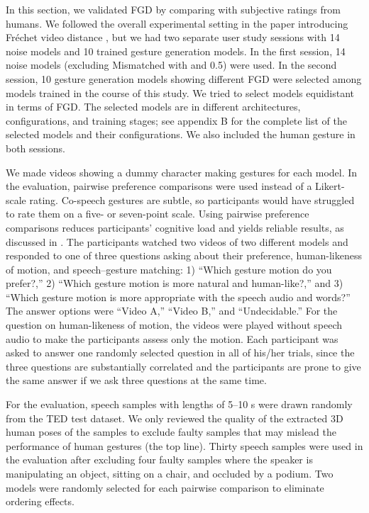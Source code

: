 \documentclass[acmtog]{acmart}
\begin{document}
In this section, we validated FGD by comparing with subjective ratings from humans. We followed the overall experimental setting in the paper introducing Fr\'{e}chet video distance \cite{unterthiner2018towards}, but we had two separate user study sessions with 14 noise models and 10 trained gesture generation models. In the first session, 14 noise models (excluding Mismatched with  and 0.5) were used. In the second session, 10 gesture generation models showing different FGD were selected among models trained in the course of this study. We tried to select models equidistant in terms of FGD. The selected models are in different architectures, configurations, and training stages; see appendix B for the complete list of the selected models and their configurations. We also included the human gesture in both sessions.

We made videos showing a dummy character making gestures for each model. In the evaluation, pairwise preference comparisons were used instead of a Likert-scale rating. Co-speech gestures are subtle, so participants would have struggled to rate them on a five- or seven-point scale. Using pairwise preference comparisons reduces participants' cognitive load and yields reliable results, as discussed in \cite{clark2018rate}. The participants watched two videos of two different models and responded to one of three questions asking about their preference, human-likeness of motion, and speech--gesture matching: 1) ``Which gesture motion do you prefer?,'' 2) ``Which gesture motion is more natural and human-like?,'' and 3) ``Which gesture motion is more appropriate with the speech audio and words?'' The answer options were ``Video A,'' ``Video B,'' and ``Undecidable.'' For the question on human-likeness of motion, the videos were played without speech audio to make the participants assess only the motion. Each participant was asked to answer one randomly selected question in all of his/her trials, since the three questions are substantially correlated and the participants are prone to give the same answer if we ask three questions at the same time.

For the evaluation, speech samples with lengths of 5--10 s were drawn randomly from the TED test dataset. We only reviewed the quality of the extracted 3D human poses of the samples to exclude faulty samples that may mislead the performance of human gestures (the top line). Thirty speech samples were used in the evaluation after excluding four faulty samples where the speaker is manipulating an object, sitting on a chair, and occluded by a podium. Two models were randomly selected for each pairwise comparison to eliminate ordering effects.
\end{document}
